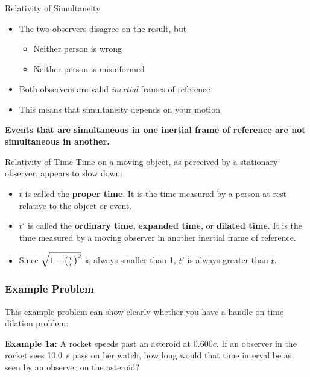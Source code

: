 \documentclass[12pt,compress,aspectratio=169]{beamer}
\newcommand{\bigsqrt}{\ensuremath\sqrt{1-\left(\frac{v}{c}\right)^2}}
\newcommand{\eq}[2]{\vspace{#1}{\Large\begin{displaymath}#2\end{displaymath}}}
\begin{document}
\begin{frame}{Relativity of Simultaneity}
  \begin{itemize}
  \item The two observers disagree on the result, but
    \begin{itemize}
    \item Neither person is wrong
    \item Neither person is misinformed
    \end{itemize}
  \item Both observers are valid \emph{inertial} frames of reference
  \item This means that simultaneity depends on your motion
  \end{itemize}
  
  \vspace{.2in}\textbf{Events that are simultaneous in one inertial frame of
    reference are not simultaneous in another.}
\end{frame}



\begin{frame}{Relativity of Time}
  Time on a moving object, as perceived by a stationary observer, appears to
  slow down:
  
  \eq{-.3in}{
    \boxed{t' =\frac{t}{\bigsqrt}=\gamma t}
  }
  \begin{itemize}
  \item $t$ is called the \textbf{proper time}. It is the time measured
    by a person at rest relative to the object or event.
  \item $t'$ is called the \textbf{ordinary time}, \textbf{expanded time}, or
    \textbf{dilated time}. It is the time measured by a moving observer in
    another inertial frame of reference.
  \item Since $\bigsqrt$ is always smaller than 1, $t'$ is always greater than
    $t$.
  \end{itemize}
\end{frame}

\begin{frame}
  \frametitle{Example Problem}

  This example problem can show clearly whether you have a handle on
  time dilation problem:
  
  \vspace{.2in}
  \textbf{Example 1a:} A rocket speeds past an asteroid at $0.600c$. If an
  observer in the rocket sees \SI{10.0}{s} pass on her watch, how long would
  that time interval be as seen by an observer on the asteroid?


\end{frame}
\end{document}
